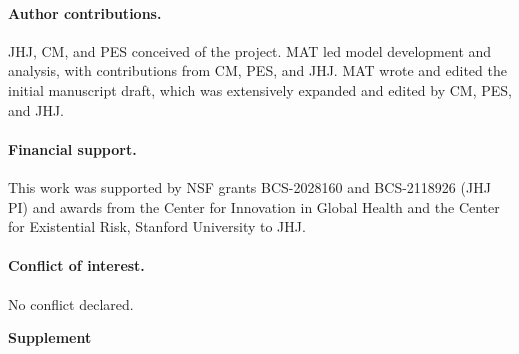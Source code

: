 \documentclass[letterpaper,11.5pt]{scrartcl}
\begin{document}
\paragraph{Author contributions.} JHJ, CM, and PES conceived of the project. MAT led model development and analysis, with contributions from CM, PES, and JHJ. MAT wrote and edited the initial manuscript draft, which was extensively expanded and edited by CM, PES, and JHJ.

\paragraph{Financial support.} This work was supported by NSF grants BCS-2028160 and BCS-2118926 (JHJ PI) and awards from the Center for Innovation in Global Health and the Center for Existential Risk, Stanford University to JHJ.

\paragraph{Conflict of interest.} No conflict declared.





\pagebreak
\begin{center}
  \textbf{\Large \textsf{Supplement}}
\end{center}
\setcounter{equation}{1}
\setcounter{figure}{0}
\setcounter{section}{0}
\setcounter{table}{0}
\setcounter{page}{1}
\makeatletter
\renewcommand{\theequation}{S\arabic{equation}}
\renewcommand{\thefigure}{S\arabic{figure}}
\renewcommand{\thetable}{S\arabic{table}}
\renewcommand{\thesection}{S\arabic{section}}
\renewcommand{\thepage}{S\arabic{page}}
\end{document}
